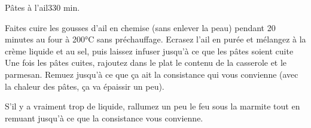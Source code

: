 {\begin{recette}{Pâtes à l'ail}{3}{30 min.}{}
\begin{preparation}
\etape Faites cuire les gousses d'ail en chemise (sans enlever la peau) pendant 20 minutes au four à 200°C sans préchauffage. 
\etape Ecrasez l'ail en purée et mélangez à la crème liquide et au sel, puis laissez infuser jusqu'à ce que les pâtes soient cuite
\etape Une fois les pâtes cuites, rajoutez dans le plat le contenu de la casserole et le parmesan. Remuez jusqu'à ce que ça ait la consistance qui vous convienne (avec la chaleur des pâtes, ça va épaissir un peu).
\begin{remarque}
S'il y a vraiment trop de liquide, rallumez un peu le feu sous la marmite tout en remuant jusqu'à ce que la consistance vous convienne.
\end{remarque}
\end{preparation}
\end{recette}

}%
